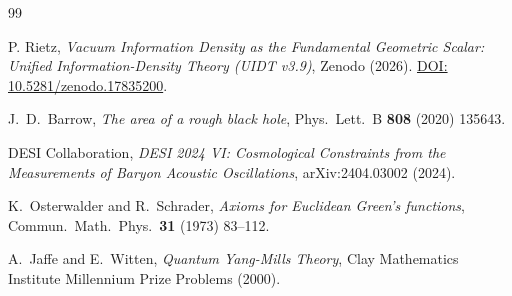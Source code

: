 \documentclass[12pt,a4paper,twoside]{article}
\theoremstyle{plain}
\theoremstyle{definition}
\theoremstyle{remark}
\begin{document}
\begin{thebibliography}{99}

P. Rietz,
\textit{Vacuum Information Density as the Fundamental Geometric Scalar:
Unified Information-Density Theory (UIDT v3.9)},
Zenodo (2026).
\href{https://doi.org/10.5281/zenodo.17835200}{DOI: 10.5281/zenodo.17835200}.

J.~D.~Barrow,
\textit{The area of a rough black hole},
Phys.\ Lett.\ B \textbf{808} (2020) 135643.

DESI Collaboration,
\textit{DESI 2024 VI: Cosmological Constraints from the Measurements of
Baryon Acoustic Oscillations},
arXiv:2404.03002 (2024).

K.~Osterwalder and R.~Schrader,
\textit{Axioms for Euclidean Green's functions},
Commun.\ Math.\ Phys.\ \textbf{31} (1973) 83--112.

A.~Jaffe and E.~Witten,
\textit{Quantum Yang-Mills Theory},
Clay Mathematics Institute Millennium Prize Problems (2000).

\end{thebibliography}
\end{document}
